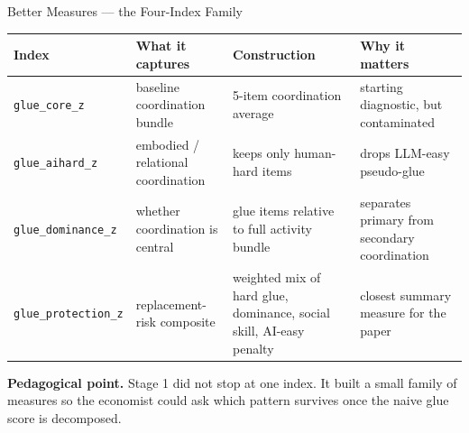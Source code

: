 \documentclass[10pt,english,aspectratio=169]{beamer}
\begin{document}
\begin{frame}{Better Measures --- the Four-Index Family}
\scriptsize
\begin{tabular}{p{2.2cm}p{3.0cm}p{3.0cm}p{3.4cm}}
\toprule
\textbf{Index} & \textbf{What it captures} & \textbf{Construction} & \textbf{Why it matters} \\
\midrule
\texttt{glue\_core\_z} & baseline coordination bundle & 5-item coordination average & starting diagnostic, but contaminated \\
\texttt{glue\_aihard\_z} & embodied / relational coordination & keeps only human-hard items & drops LLM-easy pseudo-glue \\
\texttt{glue\_dominance\_z} & whether coordination is central & glue items relative to full activity bundle & separates primary from secondary coordination \\
\texttt{glue\_protection\_z} & replacement-risk composite & weighted mix of hard glue, dominance, social skill, AI-easy penalty & closest summary measure for the paper \\
\bottomrule
\end{tabular}

\vspace{0.18cm}
\begin{tcolorbox}[colback=blue!3,colframe=RedTitle!60]\scriptsize
\textbf{Pedagogical point.} Stage 1 did not stop at one index. It built a small family of measures so the economist could ask which pattern survives once the naive glue score is decomposed.
\end{tcolorbox}
\end{frame}
\end{document}
